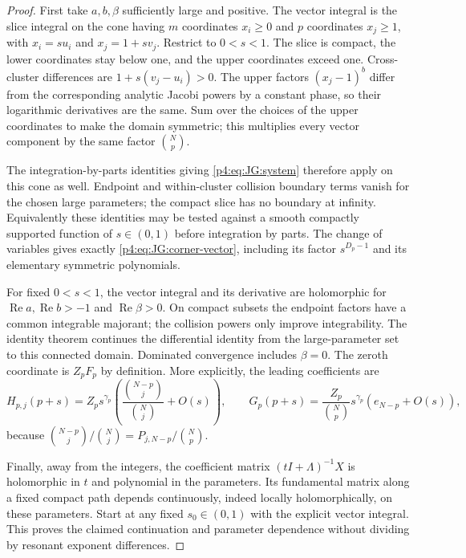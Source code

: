 \documentclass[11pt,a4paper]{article}
\theoremstyle{definition}
\theoremstyle{remark}
\numberwithin{equation}{section}
\begin{document}
\begin{proof}
First take $a,b,\beta$ sufficiently large and positive. The vector
integral is the slice integral on the cone having $m$ coordinates
$x_i\ge0$ and $p$ coordinates $x_j\ge1$, with
$x_i=su_i$ and $x_j=1+sv_j$. Restrict to $0<s<1$.
The slice is compact, the lower coordinates stay below one, and the
upper coordinates exceed one. Cross-cluster differences are
$1+s(v_j-u_i)>0$.
The upper factors $(x_j-1)^b$ differ from the corresponding analytic
Jacobi powers by a constant phase, so their logarithmic derivatives
are the same. Sum over the choices of the upper coordinates to make
the domain symmetric; this multiplies every vector component by the
same factor $\binom Np$.

The integration-by-parts identities giving \eqref{p4:eq:JG:system}
therefore apply on this cone as well. Endpoint and within-cluster
collision boundary terms vanish for the chosen large parameters;
the compact slice has no boundary at infinity. Equivalently these
identities may be tested against a smooth compactly supported function
of $s\in(0,1)$ before integration by parts. The change of variables
gives exactly \eqref{p4:eq:JG:corner-vector}, including its factor
$s^{D_p-1}$ and its elementary symmetric polynomials.

For fixed $0<s<1$, the vector integral and its derivative are
holomorphic for $\operatorname{Re}a,\operatorname{Re}b>-1$ and
$\operatorname{Re}\beta>0$. On compact subsets the endpoint factors
have a common integrable majorant; the collision powers only improve
integrability. The identity theorem continues the differential
identity from the large-parameter set to this connected domain.
Dominated convergence includes $\beta=0$.
The zeroth coordinate is $Z_pF_p$ by definition.
More explicitly, the leading coefficients are
\[
 H_{p,j}(p+s)=Z_p s^{\gamma_p}
 \left(\frac{\binom{N-p}{j}}{\binom Nj}+O(s)\right),
 \qquad
 G_p(p+s)=\frac{Z_p}{\binom Np}s^{\gamma_p}
                         \left(e_{N-p}+O(s)\right),
\]
because $\binom{N-p}{j}/\binom Nj=P_{j,N-p}/\binom Np$.

Finally, away from the integers, the coefficient matrix
$(tI+\Lambda)^{-1}X$ is holomorphic in $t$ and polynomial in the
parameters. Its fundamental matrix along a fixed compact path depends
continuously, indeed locally holomorphically, on these parameters.
Start at any fixed $s_0\in(0,1)$ with the explicit vector integral.
This proves the claimed continuation and parameter dependence without
dividing by resonant exponent differences.
\end{proof}
\end{document}
